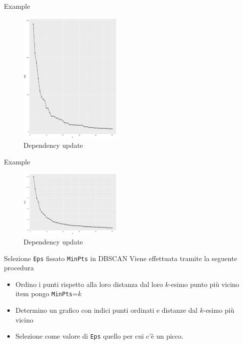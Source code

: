 \documentclass{beamer}
\begin{document}
\begin{frame}{Example}
  \begin{figure}[bt]
    \begin{center}
    \includegraphics[width = 0.45\textwidth]{../img/k-sse-asd-arc-prg-an1-mdl.pdf}
    \caption{Dependency update}
    \end{center}
  \end{figure}
\end{frame}

\begin{frame}{Example}
    \begin{figure}[bt]
      \begin{center}
      \includegraphics[width = 0.45\textwidth]{../img/k-sse-voto_medio-test.png}
      \caption{Dependency update}
      \end{center}
    \end{figure}
\end{frame}

\begin{frame}{Selezione \texttt{Eps} fissato \texttt{MinPts} in DBSCAN} 
    Viene effettuata tramite la seguente procedura
    \begin{itemize}
      \item Ordino i punti rispetto alla loro distanza dal loro $k$-esimo punto più vicino
      item pongo \texttt{MinPts}=$k$
      \item Determino un grafico con indici punti ordinati e distanze dal $k$-esimo più vicino 
      \item Selezione come valore di \texttt{Eps} quello per cui c'è un picco.
    \end{itemize} 
\end{frame}
\end{document}
